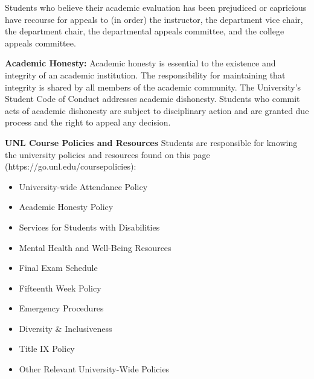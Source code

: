 \documentclass{amsart}
\begin{document}
\bigskip
{} Students who believe their academic evaluation has been prejudiced or capricious have recourse for appeals to (in
order) the instructor, the department vice chair, the department chair, the departmental appeals committee, and the college appeals committee. 



\bigskip
\noindent
{\bf Academic Honesty:}
Academic honesty is essential to the existence and integrity of an academic institution. The responsibility for maintaining that integrity is shared by all members of the academic community. The University's Student Code of Conduct addresses academic dishonesty. Students who commit acts of academic dishonesty are subject to disciplinary action and are granted due process and the right to appeal any decision.

\bigskip
\noindent
\textbf{UNL Course Policies and Resources}
Students are responsible for knowing the university policies and resources found on this page (https://go.unl.edu/coursepolicies):
 \begin{multicols}{2}
 \begin{itemize}
\item University-wide Attendance Policy
\item Academic Honesty Policy
\item Services for Students with Disabilities
\item Mental Health and Well-Being Resources
\item Final Exam Schedule 
\item Fifteenth Week Policy 
\item Emergency Procedures 
\item Diversity \& Inclusiveness 
\item Title IX Policy 
\item Other Relevant University-Wide Policies
\end{itemize} 
\end{multicols}

\vfill
\pagebreak
\smallskip
%
\end{document}
